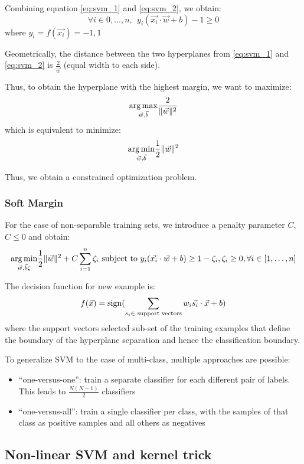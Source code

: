 Combining equation \ref{eq:svm_1} and \ref{eq:svm_2}, we obtain:
$$ \forall i \in {0, \ldots, n}, ~~ y_i (\vec{x_i} \cdot \vec{w} + b) - 1 \geq 0$$
where $y_i = f(\vec{x_i}) = {-1, 1}$

Geometrically, the distance between the two hyperplanes from \ref{eq:svm_1} and \ref{eq:svm_2} is $\frac{2}{\vec{w}}$ (equal width to each side).

Thus, to obtain the hyperplane with the highest margin, we want to maximize:
$$ \underset {\vec{w}, \vec{b}}{\operatorname {arg\,max}} \frac{2}{\lVert \vec{w} \rVert^2} $$
which is equivalent to minimize:
$$ \underset {\vec{w}, \vec{b}}{\operatorname {arg\,min}} \frac{1}{2} \lVert \vec{w} \rVert^2 $$

Thus, we obtain a constrained optimization problem.

\subsubsection{Soft Margin}

For the case of non-separable training sets, we introduce a penalty parameter $C$, $C \leq 0$ and obtain:
$$
\underset {\vec{w}, \vec{b} \zeta}{\operatorname {arg\,min}} \frac{1}{2} \lVert \vec{w} \rVert^2 + C \sum_{i = 1}^{n} \zeta_i
\text{ subject to } y_i (\vec{x_i} \cdot \vec{w} + b) \geq 1 - \zeta_i, \zeta_i \geq 0, \forall i \in [1, \ldots, n]
$$

The decision function for new example is:
$$
f(\vec{x}) = \operatorname {sign} (\sum_{s_i \in \text{ support vectors}} w_i \vec{s_i} \cdot \vec{x} + b)
$$
where the support vectors selected sub-set of the training  examples that define the boundary of the hyperplane separation and hence the classification boundary.

To generalize SVM to the case of multi-class, multiple approaches are possible:
\begin{itemize}
    \item \enquote{one-versus-one}: train a separate classifier for each different pair of labels. This leads to $\frac{N (N - 1)}{2}$ classifiers
    \item \enquote{one-versus-all}: train a single classifier per class, with the samples of that class as positive samples and all others as negatives
\end{itemize}

\subsection{Non-linear SVM and kernel trick}

